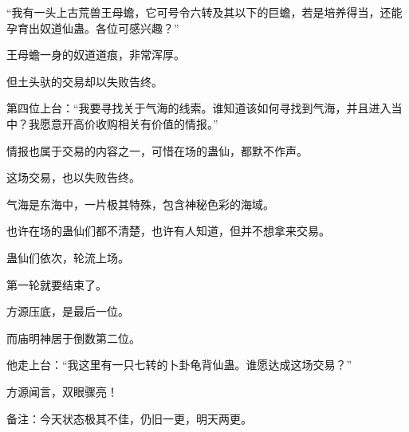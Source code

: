 \begin{this_body}
“我有一头上古荒兽王母蟾，它可号令六转及其以下的巨蟾，若是培养得当，还能孕育出奴道仙蛊。各位可感兴趣？”

王母蟾一身的奴道道痕，非常浑厚。

但土头驮的交易却以失败告终。

第四位上台：“我要寻找关于气海的线索。谁知道该如何寻找到气海，并且进入当中？我愿意开高价收购相关有价值的情报。”

情报也属于交易的内容之一，可惜在场的蛊仙，都默不作声。

这场交易，也以失败告终。

气海是东海中，一片极其特殊，包含神秘色彩的海域。

也许在场的蛊仙们都不清楚，也许有人知道，但并不想拿来交易。

蛊仙们依次，轮流上场。

第一轮就要结束了。

方源压底，是最后一位。

而庙明神居于倒数第二位。

他走上台：“我这里有一只七转的卜卦龟背仙蛊。谁愿达成这场交易？”

方源闻言，双眼骤亮！

备注：今天状态极其不佳，仍旧一更，明天两更。

\end{this_body}

